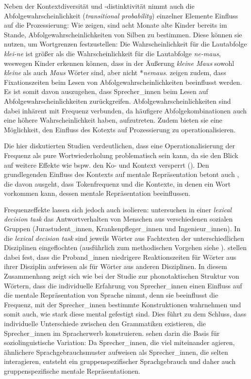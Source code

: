 Neben der Kontextdiversität und -distinktivität nimmt auch die Abfolgewahrscheinlichkeit (\textit{transitional probability}) einzelner Elemente Einfluss auf die Prozessierung: Wie \textcite{Saffran.1996} zeigen, sind acht Monate alte Kinder bereits im Stande, Abfolgewahrscheinlichkeiten von Silben zu bestimmen. Diese können sie nutzen, um Wortgrenzen festzustellen: Die Wahrscheinlichkeit für die Lautabfolge \textit{klei-ne} ist größer als die Wahrscheinlichkeit für die Lautabfolge \textit{ne-maus}, weswegen Kinder erkennen können, dass in der Äußerung \textit{kleine Maus} sowohl \textit{kleine} als auch \textit{Maus} Wörter sind, aber nicht *\textit{nemaus}. \textcite{McDonald.2003} zeigen zudem, dass  Fixationszeiten beim Lesen von Abfolgewahrscheinlichkeiten beeinflusst werden. Es ist somit davon auszugehen, dass Sprecher\_innen beim Lesen auf Abfolgewahrscheinlichkeiten zurückgreifen. Abfolgewahrscheinlichkeiten sind dabei inhärent mit Frequenz verbunden, da häufigere Abfolgekombinationen auch eine höhere Wahrscheinlichkeit haben, aufzutreten. Zudem bieten sie eine Möglichkeit, den Einfluss des Kotexts auf Prozessierung zu operationalisieren. 

Die hier diskutierten Studien verdeutlichen, dass eine Operationalisierung der Frequenz als pure Wortwiederholung problematisch sein kann, da sie den Blick auf weitere Effekte wie bspw. den Ko- und Kontext versperrt (\cite[58--60]{Divjak.2015}). Den grundlegenden Einfluss des Kontexts auf mentale Repräsentation betont auch \textcite[17]{Goldberg.2019}, die davon ausgeht, dass Tokenfrequenz und die Kontexte, in denen ein Wort vorkommen kann, dessen mentale Repräsentation beeinflussen.     

\begin{sloppypar}
Frequenzeffekte lassen sich jedoch auch isolieren: \textcite{Gardner.1987} untersuchen  in einer \textit{lexical decision task} das Antwortverhalten von Menschen aus verschiedenen sozialen Gruppen (Jurastudent\_innen, Krankenpfleger\_innen und Ingenieur\_innen). In die \textit{lexical decision task} sind jeweils Wörter aus Fachtexten der unterschiedlichen Disziplinen eingeflochten (ausführlich zum methodischen Vorgehen siehe \cite[25--26]{Gardner.1987}). \textcite[26--28]{Gardner.1987} stellen dabei fest, dass die Proband\_innen niedrigere Reaktionszeiten für Wörter aus ihrer Disziplin aufwiesen als für Wörter aus anderen Disziplinen. In diesem Zusammenhang zeigt sich wie bei der Studie zur phonotaktischen Struktur von Wörtern, dass die individuelle Erfahrung von Sprecher\_innen einen Einfluss auf die mentale Repräsentation von Sprache nimmt, denn sie beeinflusst die Frequenz, mit der Sprecher\_innen bestimmte Konstruktionen wahrnehmen und somit auch, wie stark diese mental gefestigt sind. Dies führt zu dem Schluss, dass individuelle Unterschiede zwischen den Grammatiken existieren, die Sprecher\_innen im Spracherwerb konstruieren. \textcite[xviii]{Kemmer.2000} sehen darin die Basis für soziolinguistische Variation: Da Sprecher\_innen, die viel miteinander agieren, ähnlichere Sprachgebrauchsmuster aufweisen als Sprecher\_innen, die selten interagieren, entsteht ein gruppenspezifischer Sprachgebrauch und daher auch gruppenspezifische mentale Repräsentationen. 
\end{sloppypar}

